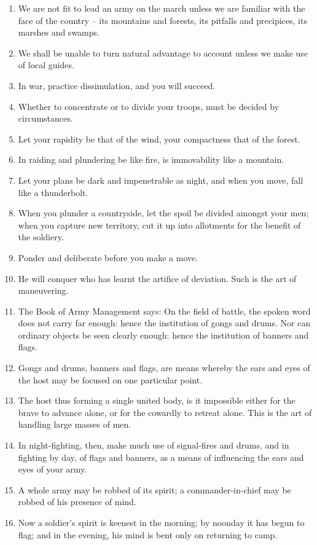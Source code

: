 \documentclass[oneside]{book}
\begin{document}
\begin{enumerate}
	\item We are not fit to lead an army on the march unless we are familiar with the face of the country – its mountains and forests, its pitfalls and precipices, its marshes and swamps.
	\item We shall be unable to turn natural advantage to account unless we make use of local guides.
	\item In war, practice dissimulation, and you will succeed.
	\item Whether to concentrate or to divide your troops, must be decided by circumstances.
	\item Let your rapidity be that of the wind, your compactness that of the forest.
	\item In raiding and plundering be like fire, is immovability like a mountain.
	\item Let your plans be dark and impenetrable as night, and when you move, fall like a thunderbolt.
	\item When you plunder a countryside, let the spoil be divided amongst your men; when you capture new territory, cut it up into allotments for the benefit of the soldiery.
	\item Ponder and deliberate before you make a move.
	\item He will conquer who has learnt the artifice of deviation. Such is the art of maneuvering.
	\item The Book of Army Management says: On the field of battle, the spoken word does not carry far enough: hence the institution of gongs and drums. Nor can ordinary objects be seen clearly enough: hence the institution of banners and flags.
	\item Gongs and drums, banners and flags, are means whereby the ears and eyes of the host may be focused on one particular point.
	\item The host thus forming a single united body, is it impossible either for the brave to advance alone, or for the cowardly to retreat alone. This is the art of handling large masses of men.
	\item In night-fighting, then, make much use of signal-fires and drums, and in fighting by day, of flags and banners, as a means of influencing the ears and eyes of your army.
	\item A whole army may be robbed of its spirit; a commander-in-chief may be robbed of his presence of mind.
	\item Now a soldier's spirit is keenest in the morning; by noonday it has begun to flag; and in the evening, his mind is bent only on returning to camp.

\end{enumerate}
\end{document}
